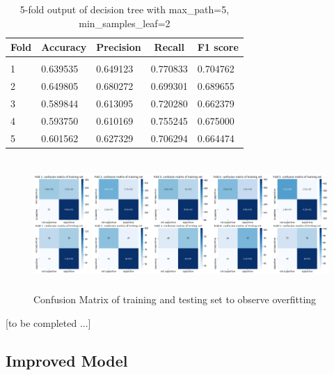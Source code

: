 \documentclass{article} %
\begin{document}
\begin{table}[H]
	\caption{5-fold output of decision tree with max\_path=5, min\_samples\_leaf=2}
	\label{sample-table}
	\begin{center}
		\begin{tabular}{|l|l|l|l|l|}
			\multicolumn{1}{c}{\bf Fold}  
			&\multicolumn{1}{c}{\bf Accuracy}
			&\multicolumn{1}{c}{\bf Precision} 
			&\multicolumn{1}{c}{\bf Recall}
			&\multicolumn{1}{c}{\bf F1 score}
			\\ \hline & & & & \\
			1	&0.639535	&0.649123	&0.770833	&0.704762 \\
			2	&0.649805	&0.680272	&0.699301	&0.689655 \\
			3	&0.589844	&0.613095	&0.720280	&0.662379 \\ 
			4	&0.593750	&0.610169	&0.755245	&0.675000  \\
			5	&0.601562	&0.627329	&0.706294	&0.664474  \\
			\hline
		\end{tabular}
	\end{center}
\end{table}

\begin{figure}[H]
	\includegraphics[height=5cm, width=17cm]{5.png}
	\caption{Confusion Matrix of training and testing set to observe overfitting}
\end{figure}


[to be completed ...]


\subsection{Improved Model}
\end{document}
